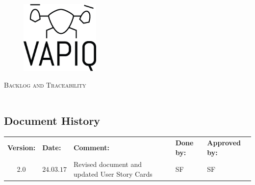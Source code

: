 \documentclass{article}
\author{Aleksander Holthe  \\ Katrine Sundal Haune \\ Kent Kjeldaas \\ Stian Fredriksen \\ Tomas Lyngroth \\ Vanja Katinka Halvorsen}
\makeatletter
\let\vapiqteam\@author
\makeatother
\begin{document}
\begin{titlepage}
    \centering
    \pagecolor{gainsboro}
	\\[3.0 cm]
    \begin{figure}[h]
        \centering
        \includegraphics[width = 0.35\textwidth]{VAPIQ-PICTURES//Logo2_Tilted.png}
        \\[2.0 cm] 
    \end{figure}                              
    \textsc{\Huge Backlog and Traceability}  
    \\[1 cm]
    \textsc{\Large }   
    \\[3.0 cm]
	\large \vapiqteam      
\end{titlepage}
\pagecolor{white}


\begin{center}
\section*{\textbf{Document History}}
\begin{tabular}{cllll}
\rowcolor{cadetgrey}
\textbf{Version:}    &\textbf{Date:} 	 &\textbf{Comment:}    &\textbf{Done by:}   &\textbf{Approved by:}  \\

2.0       & $24.03.17$   & Revised document and updated User Story Cards  & SF  & SF \\
\end{tabular}                                                                   
\end{center}
\end{document}
